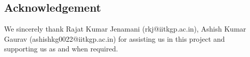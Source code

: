 \documentclass[runningheads]{llncs}
\begin{document}
\subsection*{Acknowledgement}
We sincerely thank Rajat Kumar Jenamani (rkj@iitkgp.ac.in), Ashish Kumar Gaurav (ashishkg0022@iitkgp.ac.in) for assisting us in this project and supporting us as and when required.
\end{document}
